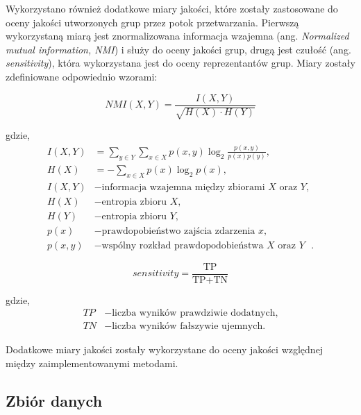         Wykorzystano również dodatkowe miary jakości, które zostały zastosowane do oceny jakości utworzonych grup przez potok przetwarzania. Pierwszą wykorzystaną miarą jest znormalizowana informacja wzajemna (ang. \textit{Normalized mutual information, NMI}) i służy do oceny jakości grup, drugą jest czułość (ang. \textit{sensitivity}), która wykorzystana jest do oceny reprezentantów grup. Miary zostały zdefiniowane odpowiednio wzorami:

        \begin{equation}
            NMI(X, Y) = \frac{I(X, Y)}{\sqrt{H(X) \cdot H(Y)}}
            \label{Equation:NMI}
        \end{equation}

        gdzie,
        \begin{align*}
            I(X, Y) &= \sum_{y \in Y}{ \sum_{x \in X}{p(x, y) \log_{2}{\frac{p(x, y)}{p(x) p(y)}}}}, \\
            H(X) &= - \sum_{x \in X}{ p(x) \log_{2}{p(x)}}, \\
            I(X, Y) &- \text{informacja wzajemna między zbiorami $X$ oraz $Y$}, \\
            H(X) &- \text{entropia zbioru $X$}, \\
            H(Y) &- \text{entropia zbioru $Y$}, \\
            p(x) &- \text{prawdopobieństwo zajścia zdarzenia $x$}, \\
            p(x, y) &- \text{wspólny rozkład prawdopodobieństwa $X$ oraz $Y$ }.
        \end{align*}

        \begin{equation}
            sensitivity = \frac{\text{TP}}{
                \text{TP} + \text{TN}
            }
            \label{Equation:Sensitivity}
        \end{equation}

        gdzie,
        \begin{align*}
            TP &- \text{liczba wyników prawdziwie dodatnych,} \\
            TN &- \text{liczba wyników fałszywie ujemnych.}
        \end{align*}

        Dodatkowe miary jakości zostały wykorzystane do oceny jakości względnej między zaimplementowanymi metodami.

    \subsection{Zbiór danych}

